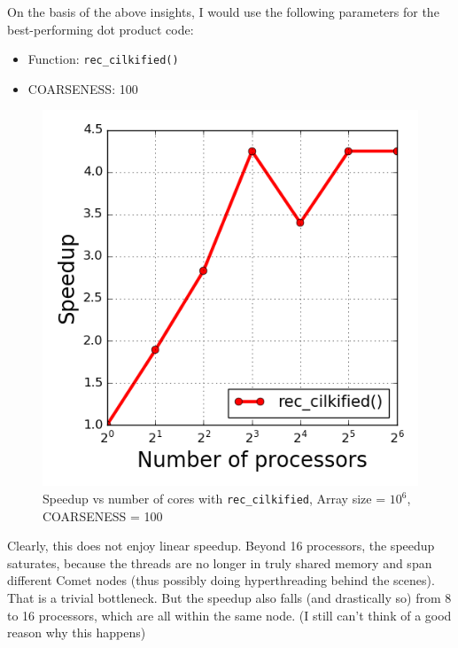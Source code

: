 \documentclass[12pt,letterpaper]{article}
\begin{document}
\noindent On the basis of the above insights, I would use the following parameters for the best-performing dot product code:
%
\begin{itemize}
\item Function: \texttt{rec\_cilkified()}
\item COARSENESS: 100
\end{itemize}
%
\begin{figure}[h]
\centering
\includegraphics[scale=0.5]{best_dot_prod.png}
\caption{Speedup vs number of cores with \texttt{rec\_cilkified}, Array size = $10^6$, COARSENESS = 100}
\end{figure}
%
\noindent Clearly, this does not enjoy linear speedup. Beyond 16 processors, the speedup saturates, because the threads are no longer in truly shared memory and span different Comet nodes (thus possibly doing hyperthreading behind the scenes). That is a trivial bottleneck. But the speedup also falls (and drastically so) from 8 to 16 processors, which are all within the same node. (I still can't think of a good reason why this happens)
\end{document}
